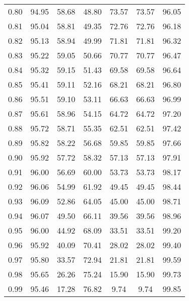 \begin{tabular}{|c|c|c|c|c|c|c|}
      0.80 &     94.95 &     58.68 &      48.80 &   73.57 &      73.57 &         96.05 \\
      0.81 &     95.04 &     58.81 &      49.35 &   72.76 &      72.76 &         96.18 \\
      0.82 &     95.13 &     58.94 &      49.99 &   71.81 &      71.81 &         96.32 \\
      0.83 &     95.22 &     59.05 &      50.66 &   70.77 &      70.77 &         96.47 \\
      0.84 &     95.32 &     59.15 &      51.43 &   69.58 &      69.58 &         96.64 \\
      0.85 &     95.41 &     59.11 &      52.16 &   68.21 &      68.21 &         96.80 \\
      0.86 &     95.51 &     59.10 &      53.11 &   66.63 &      66.63 &         96.99 \\
      0.87 &     95.61 &     58.96 &      54.15 &   64.72 &      64.72 &         97.20 \\
      0.88 &     95.72 &     58.71 &      55.35 &   62.51 &      62.51 &         97.42 \\
      0.89 &     95.82 &     58.22 &      56.68 &   59.85 &      59.85 &         97.66 \\
      0.90 &     95.92 &     57.72 &      58.32 &   57.13 &      57.13 &         97.91 \\
      0.91 &     96.00 &     56.69 &      60.00 &   53.73 &      53.73 &         98.17 \\
      0.92 &     96.06 &     54.99 &      61.92 &   49.45 &      49.45 &         98.44 \\
      0.93 &     96.09 &     52.86 &      64.05 &   45.00 &      45.00 &         98.71 \\
      0.94 &     96.07 &     49.50 &      66.11 &   39.56 &      39.56 &         98.96 \\
      0.95 &     96.00 &     44.92 &      68.09 &   33.51 &      33.51 &         99.20 \\
      0.96 &     95.92 &     40.09 &      70.41 &   28.02 &      28.02 &         99.40 \\
      0.97 &     95.80 &     33.57 &      72.94 &   21.81 &      21.81 &         99.59 \\
      0.98 &     95.65 &     26.26 &      75.24 &   15.90 &      15.90 &         99.73 \\
      0.99 &     95.46 &     17.28 &      76.82 &    9.74 &       9.74 &         99.85 \\
\bottomrule
\end{tabular}
